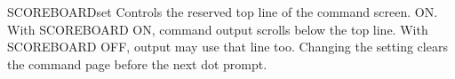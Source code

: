 \begin{XbaseEntry}{SCOREBOARD}{set}
Controls the reserved top line of the command screen.
\Syntax
{}
\Defaults
ON.
\Usage
With SCOREBOARD ON, command output scrolls below the top line.
With SCOREBOARD OFF, output may use that line too.
Changing the setting clears the command page before the next dot prompt.
\end{XbaseEntry}
